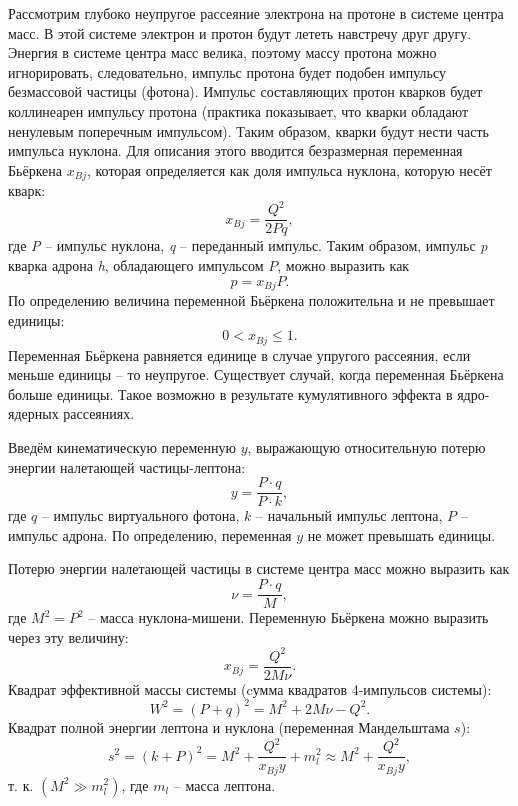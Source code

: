 \documentclass{extarticle}
\begin{document}
Рассмотрим глубоко неупругое рассеяние электрона на протоне в системе центра масс. В этой системе электрон и протон будут лететь навстречу друг другу. Энергия в системе центра масс велика, поэтому массу протона можно игнорировать, следовательно, импульс протона будет подобен импульсу безмассовой частицы (фотона). Импульс составляющих протон кварков будет коллинеарен импульсу протона (практика показывает, что кварки обладают ненулевым поперечным импульсом). Таким образом, кварки будут нести часть импульса нуклона. Для описания этого вводится безразмерная переменная Бьёркена $x_{Bj}$, которая определяется как доля импульса нуклона, которую несёт кварк:
\begin{equation}
    x_{Bj}= \frac{Q^2}{2Pq},
\end{equation}
где \textit{P} -- импульс нуклона, \textit{q} -- переданный импульс. 
Таким образом, импульс \textit{p} кварка адрона \textit{h}, обладающего импульсом $P$, можно выразить как
\begin{equation}
    p=x_{Bj}P.
\end{equation}
По определению величина переменной Бьёркена положительна и не превышает единицы: 
\begin{equation}
    0 < x_{Bj} \leq 1.
\end{equation}
Переменная Бьёркена равняется единице в случае упругого рассеяния, если меньше единицы -- то неупругое. Существует случай, когда переменная Бьёркена больше единицы. Такое возможно в результате кумулятивного эффекта в ядро-ядерных рассеяниях.

Введём кинематическую переменную $y$, выражающую относительную потерю энергии налетающей частицы-лептона:
\begin{equation}
    y = \frac{P \cdot q}{P \cdot k},
\end{equation}
где $q$ -- импульс виртуального фотона, $k$ -- начальный импульс лептона, $P$ -- импульс адрона. По определению, переменная $y$ не может превышать единицы.

Потерю энергии налетающей частицы в системе центра масс можно выразить как 
\begin{equation}
    \nu = \frac{P \cdot q}{M},
\end{equation}
где $M^2 = P^2$ -- масса нуклона-мишени. Переменную Бьёркена можно выразить через эту величину:
\begin{equation}
    x_{Bj} = \frac{Q^2}{2M\nu}.
\end{equation}
Квадрат эффективной массы системы (cумма квадратов 4-импульсов системы):
\begin{equation}
	W^2 = (P+q)^2 = M^2 + 2M\nu - Q^2.
\end{equation}
Квадрат полной энергии лептона и нуклона (переменная Мандельштама $s$):
\begin{equation}
	s^2 = (k+P)^2 = M^2 + \frac{Q^2}{x_{Bj}y} + m_l^2 \approx M^2 + \frac{Q^2}{x_{Bj}y}, 
\end{equation}
т. к. $(M^2 \gg m_l^2)$, где $m_l$ -- масса лептона. 
\end{document}
